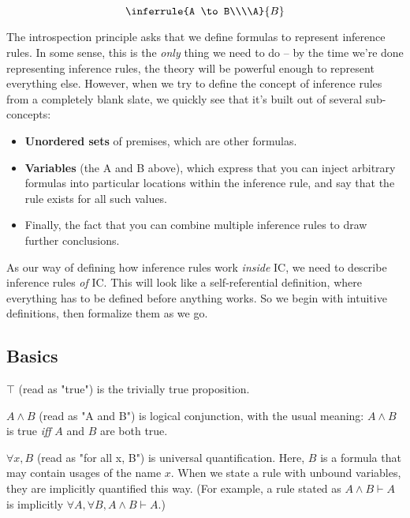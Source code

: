 \documentclass{article}
\begin{document}
  \begin{equation*}
    \inferrule{A \to B\\\\A}{B}
  \end{equation*}
  
  The introspection principle asks that we define formulas to represent inference rules.
  In some sense, this is the \emph{only} thing we need to do – by the time we're done representing inference rules, the theory will be powerful enough to represent everything else.
  However, when we try to define the concept of inference rules from a completely blank slate, we quickly see that it's built out of several sub-concepts:
  \begin{itemize}
    \item \textbf{Unordered sets} of premises, which are other formulas.
    \item \textbf{Variables} (the A and B above), which express that you can inject arbitrary formulas into particular locations within the inference rule, and say that the rule exists for all such values.
    \item Finally, the fact that you can combine multiple inference rules to draw further conclusions.
  \end{itemize}
  
  As our way of defining how inference rules work \emph{inside} IC, we need to describe inference rules \emph{of} IC. This will look like a self-referential definition, where everything has to be defined before anything works. So we begin with intuitive definitions, then formalize them as we go.
    
  \subsection{Basics}
  
  $\top$ (read as "true") is the trivially true proposition.
  
  $A \wedge B$ (read as "A and B") is logical conjunction, with the usual meaning: $A \wedge B$ is true \emph{iff} $A$ and $B$ are both true.

  \newcommand{\objto}{\hookrightarrow}
  $\forall x, B$ (read as "for all x, B") is universal quantification. Here, $B$ is a formula that may contain usages of the name $x$. When we state a rule with unbound variables, they are implicitly quantified this way. (For example, a rule stated as $A \wedge B \vdash A$ is implicitly $\forall A, \forall B, A \wedge B \vdash A$.)
  
\end{document}
